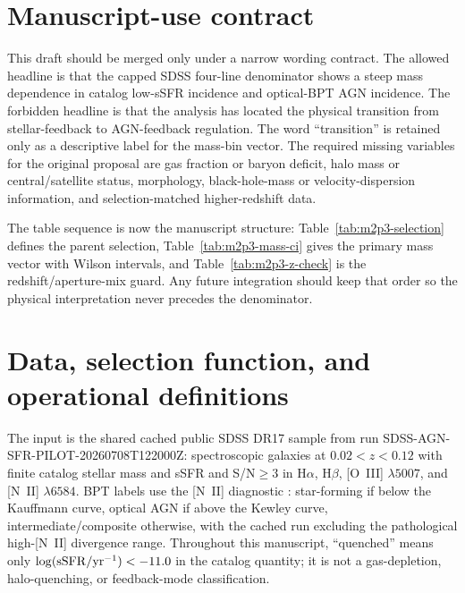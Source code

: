 \documentclass[twocolumn]{aastex631}
\begin{document}
\section{Manuscript-use contract}\label{sec:m2p3_contract}
This draft should be merged only under a narrow wording contract.  The allowed headline is that the capped SDSS four-line denominator shows a steep mass dependence in catalog low-sSFR incidence and optical-BPT AGN incidence.  The forbidden headline is that the analysis has located the physical transition from stellar-feedback to AGN-feedback regulation.  The word ``transition'' is retained only as a descriptive label for the mass-bin vector.  The required missing variables for the original proposal are gas fraction or baryon deficit, halo mass or central/satellite status, morphology, black-hole-mass or velocity-dispersion information, and selection-matched higher-redshift data.

The table sequence is now the manuscript structure: Table~\ref{tab:m2p3-selection} defines the parent selection, Table~\ref{tab:m2p3-mass-ci} gives the primary mass vector with Wilson intervals, and Table~\ref{tab:m2p3-z-check} is the redshift/aperture-mix guard.  Any future integration should keep that order so the physical interpretation never precedes the denominator.

\section{Data, selection function, and operational definitions}
The input is the shared cached public SDSS DR17 sample from run SDSS-AGN-SFR-PILOT-20260708T122000Z: spectroscopic galaxies at $0.02<z<0.12$ with finite catalog stellar mass and sSFR and S/N$\geq3$ in H$\alpha$, H$\beta$, [O~III] $\lambda5007$, and [N~II] $\lambda6584$.  BPT labels use the [N~II] diagnostic \citep{baldwin1981,kewley2001,kauffmann2003bpt}: star-forming if below the Kauffmann curve, optical AGN if above the Kewley curve, intermediate/composite otherwise, with the cached run excluding the pathological high-[N~II] divergence range.  Throughout this manuscript, ``quenched'' means only $\log({\rm sSFR}/{\rm yr}^{-1})<-11.0$ in the catalog quantity; it is not a gas-depletion, halo-quenching, or feedback-mode classification.
\end{document}

